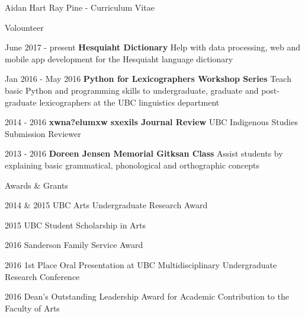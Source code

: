 \documentclass[12pt]{letter}
\begin{document}
\begin{cv}{ Aidan Hart Ray Pine  \space - \space   Curriculum Vitae}
        \begin{cvlist}{Volounteer}
                            \item[June 2017 - present] \textbf{Hesquiaht Dictionary}
                \newline Help with data processing, web and mobile app development for the Hesquiaht language dictionary
                            \item[Jan 2016 - May 2016] \textbf{Python for Lexicographers Workshop Series}
                \newline Teach basic Python and programming skills to undergraduate, graduate and post-graduate lexicographers at the UBC linguistics department
                            \item[2014 - 2016] \textbf{xwna?elumxw sxexils Journal Review}
                \newline UBC Indigenous Studies Submission Reviewer
                            \item[2013 - 2016] \textbf{Doreen Jensen Memorial Gitksan Class}
                \newline Assist students by explaining basic grammatical, phonological and orthographic concepts
                    \end{cvlist}

        \begin{cvlist}{Awards \& Grants}
                        \item[2014 \& 2015] UBC Arts Undergraduate Research Award
                        \item[2015] UBC Student Scholarship in Arts
                        \item[2016] Sanderson Family Service Award
                        \item[2016] 1st Place Oral Presentation at UBC Multidisciplinary Undergraduate Research Conference
                        \item[2016] Dean's Outstanding Leadership Award for Academic Contribution to the Faculty of Arts
                    \end{cvlist}

    \end{cv}
    
    
\end{document}
